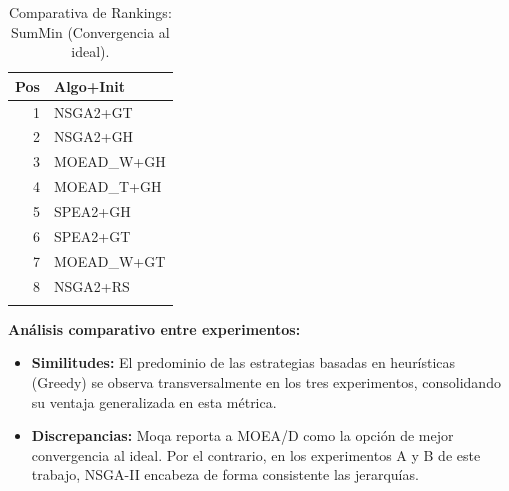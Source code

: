 \documentclass[a4paper,10pt]{article}
\begin{document}
\begin{table}[H]
\begin{minipage}[t]{0.32\textwidth}
        \begin{tabular}{rl}
            \toprule
            Pos & Algo+Init \\ \midrule
            1 & NSGA2+GT \\
            2 & NSGA2+GH \\
            3 & MOEAD\_W+GH \\
            4 & MOEAD\_T+GH \\
            5 & SPEA2+GH \\
            6 & SPEA2+GT \\
            7 & MOEAD\_W+GT \\
            8 & NSGA2+RS \\
            \\
            \bottomrule
        \end{tabular}
    \end{minipage}
    \caption{Comparativa de Rankings: SumMin (Convergencia al ideal).}
\end{table}

\textbf{Análisis comparativo entre experimentos:}
\begin{itemize}
    \item \textbf{Similitudes:} El predominio de las estrategias basadas en heurísticas (Greedy) se observa transversalmente en los tres experimentos, consolidando su ventaja generalizada en esta métrica.
    \item \textbf{Discrepancias:} Moqa reporta a MOEA/D como la opción de mejor convergencia al ideal. Por el contrario, en los experimentos A y B de este trabajo, NSGA-II encabeza de forma consistente las jerarquías.
\end{itemize}
\end{document}
